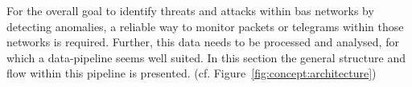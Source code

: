 For the overall goal to identify threats and attacks within \gls{bas} networks by detecting anomalies, a reliable way to monitor packets or telegrams within those networks is required. Further, this data needs to be processed and analysed, for which a data-pipeline seems well suited.
In this section the general structure and flow within this pipeline is presented. (cf. Figure~\ref{fig:concept:architecture})

